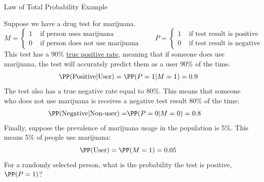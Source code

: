 \documentclass[compress, 8pt]{beamer}
\begin{document}
\begin{frame}{Law of Total Probability Example}

Suppose we have a drug test for marijuana.
\begin{equation*}
     M = \begin{cases} 1 &\text{ if person uses marijuana} \\
     0 &\text{ if person does not use marijuana} \end{cases}
     \quad\quad
     P = \begin{cases} 1 &\text{ if test result is positive} \\
     0 &\text{ if test result is negative} \end{cases}
 \end{equation*} This test has a 90\% \href{https://en.wikipedia.org/wiki/Sensitivity_and_specificity}{true positive rate}, meaning that if someone does use marijuana, the test will accurately predict them as a user 90\% of the time.
\begin{equation*}
    \PP (\text{Positive} \vert \text{User}) = \PP (P = 1 \vert M =1 ) = 0.9
\end{equation*}
The test also has a true negative rate equal to 80\%. This means that someone who does not use marijuana is receives a negative test result 80\% of the time:
\begin{align*}
    \PP (\text{Negative} \vert \text{Non-user}) =& \PP (P = 0 \vert M = 0) = 0.8
\end{align*}
Finally, suppose the prevalence of marijuana usage in the population is 5\%. This means 5\% of people use marijuana:
\begin{equation*}
    \PP (\text{User}) = \PP (M = 1) = 0.05
\end{equation*}
For a randomly selected person, what is the probability the test is positive, $\PP (P = 1)$?

\end{frame}
\end{document}
